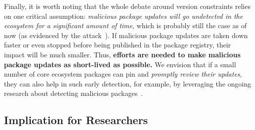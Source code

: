 Finally, it is worth noting that the whole debate around version constraints relies on one critical assumption: \emph{malicious package updates will go undetected in the ecosystem for a significant amount of time}, which is probably still the case as of now (as evidenced by the  attack~\cite{xz-utils}).
If malicious package updates are taken down faster or even stopped before being published in the package registry, their impact  will be much smaller.
Thus, \textbf{efforts are needed to make malicious package updates as short-lived as possible.}
We envision that if a small number of core ecosystem packages can pin and \emph{promptly review their updates}, they can also help in such early detection, for example, by leveraging the ongoing research about detecting malicious packages~\cite[e.g.,][]{DBLP:conf/icse/SejfiaS22, DBLP:journals/corr/abs-2403-12196}.

\subsection{Implication for Researchers}

